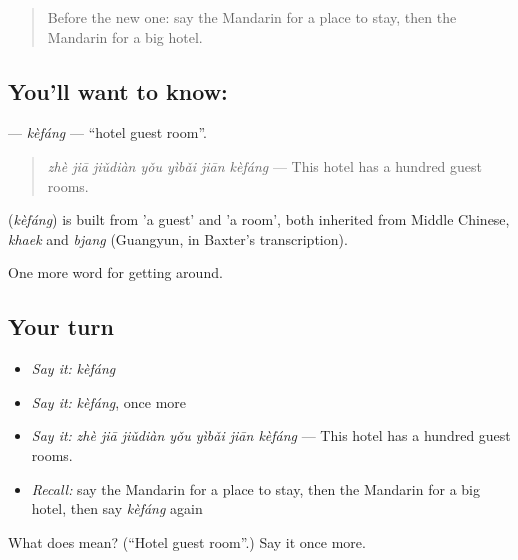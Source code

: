 \label{lesson:ZH-C425-kefang}



\begin{quote}
Before the new one: say the Mandarin for a place to stay, then the Mandarin for a big hotel.
\end{quote}

\subsection*{You'll want to know: }
\textbf{} — \emph{kèfáng} — \textquotedblleft{}hotel guest room\textquotedblright{}.

\begin{quote}
\textbf{} \emph{zhè jiā jiǔdiàn yǒu yìbǎi jiān kèfáng} — This hotel has a hundred guest rooms.
\end{quote}

\begin{cousinweb}
\textbf{} (\emph{kèfáng}) is built from  'a guest' and  'a room', both inherited from Middle Chinese, \emph{khaek} and \emph{bjang} (Guangyun, in Baxter's transcription).
\end{cousinweb}

\begin{grammarlens}[title={What you've built}]
One more word for getting around.
\end{grammarlens}

\subsection*{Your turn}
\begin{itemize}
\raggedright
  \item \emph{Say it:} \emph{kèfáng}
  \item \emph{Say it:} \emph{kèfáng}, once more
  \item \emph{Say it:} \emph{zhè jiā jiǔdiàn yǒu yìbǎi jiān kèfáng} — This hotel has a hundred guest rooms.
  \item \emph{Recall:} say the Mandarin for a place to stay, then the Mandarin for a big hotel, then say \emph{kèfáng} again
\end{itemize}

\begin{tcolorbox}[breakable,colback=teal!4,colframe=teal!35!black,title={Before you move on}]
What does  mean? (\textquotedblleft{}Hotel guest room\textquotedblright{}.) Say it once more.
\end{tcolorbox}
